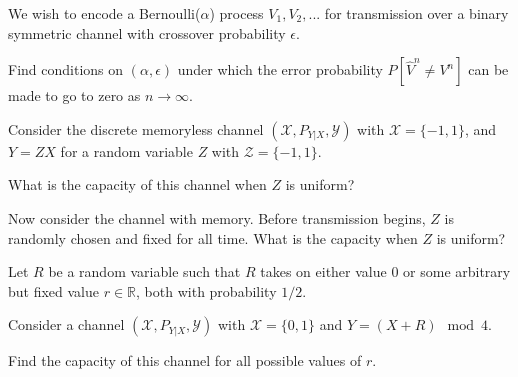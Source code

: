 \documentclass[a4paper,10pt,landscape,twocolumn]{scrartcl}
\begin{document}
\begin{exercise}
We wish to encode a Bernoulli($\alpha$) process $V_1, V_2, ...$ for transmission over a binary symmetric channel with crossover probability $\epsilon$.
\begin{center}
\end{center}
Find conditions on $(\alpha,\epsilon)$ under which the error probability $P[\hat{V}^n \neq V^n]$ can be made to go to zero as $n \to \infty$.
\end{exercise}

\begin{exercise}
Consider the discrete memoryless channel $(\mathcal{X}, P_{Y|X}, \mathcal{Y})$ with $\mathcal{X} = \{-1,1\}$, and $Y = ZX$ for a random variable $Z$ with $\mathcal{Z} = \{-1,1\}$.
\begin{subex}
What is the capacity of this channel when $Z$ is uniform?
\end{subex}
\begin{subex}
Now consider the channel with memory. Before transmission begins, $Z$ is randomly chosen and fixed for all time. What is the capacity when $Z$ is uniform?
\end{subex}
\end{exercise}

\begin{exercise}
Let $R$ be a random variable such that $R$ takes on either value 0 or some arbitrary but fixed value $r \in \mathbb{R}$, both with probability $1/2$.

Consider a channel $(\mathcal{X},P_{Y|X},\mathcal{Y})$ with $\mathcal{X} = \{0,1\}$ and
$Y = (X+R) \mod 4$.

Find the capacity of this channel for all possible values of $r$.
\end{exercise}
\end{document}
